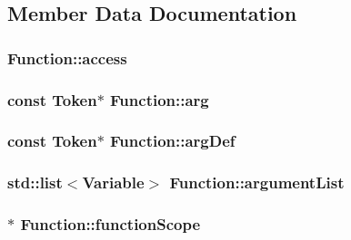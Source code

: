 \subsection{Member Data Documentation}
\hypertarget{class_function_a14053d43d3bc832afaf4ed1ba1994102}{
\subsubsection[{access}]{ Function\-::access}}\label{class_function_a14053d43d3bc832afaf4ed1ba1994102}
\hypertarget{class_function_abdee3005ea57c01a14996eac8b6be915}{
\subsubsection[{arg}]{\setlength{\rightskip}{0pt plus 5cm}const {\bf Token}$\ast$ Function\-::arg}}\label{class_function_abdee3005ea57c01a14996eac8b6be915}
\hypertarget{class_function_a31b432f7594922741cf4235e21ffd56e}{
\subsubsection[{arg\-Def}]{\setlength{\rightskip}{0pt plus 5cm}const {\bf Token}$\ast$ Function\-::arg\-Def}}\label{class_function_a31b432f7594922741cf4235e21ffd56e}
\hypertarget{class_function_ae0dd1fb41d8a7591aeadc3367909a414}{
\subsubsection[{argument\-List}]{\setlength{\rightskip}{0pt plus 5cm}std\-::list$<${\bf Variable}$>$ Function\-::argument\-List}}\label{class_function_ae0dd1fb41d8a7591aeadc3367909a414}
\hypertarget{class_function_a6673ca3db09fd6aa422400f3400a9ba5}{
\subsubsection[{function\-Scope}]{$\ast$ Function\-::function\-Scope}}\label{class_function_a6673ca3db09fd6aa422400f3400a9ba5}
